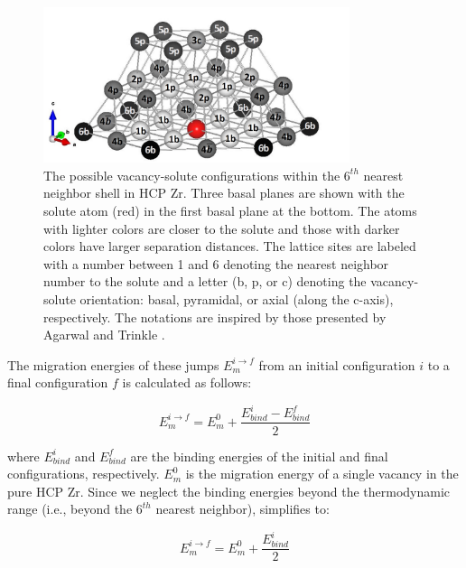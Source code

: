 \documentclass[preprint,12pt]{elsarticle}
\begin{document}
\begin{figure}[h!]
    \centering \includegraphics[width=0.8\textwidth]{1_configurations_labelled.jpg}
    \caption{The possible vacancy-solute configurations within the $6^{th}$ nearest neighbor shell in HCP Zr. Three basal planes are shown with the solute atom (red) in the first basal plane at the bottom. The atoms with lighter colors are closer to the solute and those with darker colors have larger separation distances. The lattice sites are labeled with a number between 1 and 6 denoting the nearest neighbor number to the solute and a letter (b, p, or c) denoting the vacancy-solute orientation: basal, pyramidal, or axial (along the c-axis), respectively. The notations are inspired by those presented by Agarwal and Trinkle \cite{agarwal_exact_2017}.}
    \label{fig:configurations}
\end{figure}

The migration energies of these jumps $ E_m^{i\rightarrow f}$ from an initial configuration $i$ to a final configuration $f$ is calculated as follows:

\begin{equation}
\label{eq_KRA}
    E_m^{i\rightarrow f} = E_m^0 + \frac{E_{bind}^i - E_{bind}^f}{2}
\end{equation}

\noindent where $E_{bind}^i$ and $E_{bind}^f$ are the binding energies of the initial and final configurations, respectively. $E_m^0$ is the migration energy of a single vacancy in the pure HCP Zr. Since we neglect the binding energies beyond the thermodynamic range (i.e., beyond the $6^{th}$ nearest neighbor),  simplifies to:

\begin{equation}
      E_m^{i\rightarrow f} = E_m^0 + \frac{E_{bind}^i}{2}  
\end{equation}
\end{document}
